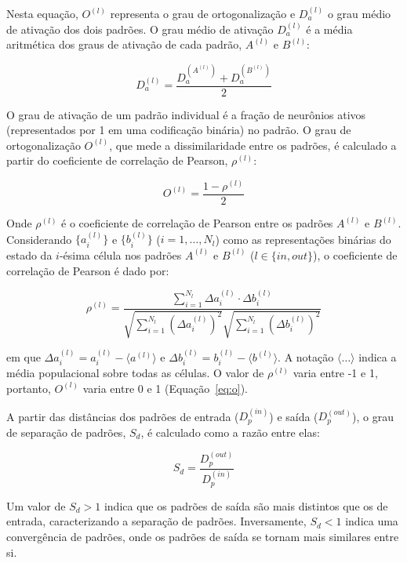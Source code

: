 Nesta equação, $O^{(l)}$ representa o grau de ortogonalização e $D_a^{(l)}$ o grau médio de ativação dos dois padrões. O grau médio de ativação $D_a^{(l)}$ é a média aritmética dos graus de ativação de cada padrão, $A^{(l)}$ e $B^{(l)}$:

\begin{equation}
    \label{eq:da}
    D_a^{(l)} = \frac{D_a^{(A^{(l)})} + D_a^{(B^{(l)})}}{2}
\end{equation}

O grau de ativação de um padrão individual é a fração de neurônios ativos (representados por 1 em uma codificação binária) no padrão.
O grau de ortogonalização $O^{(l)}$, que mede a dissimilaridade entre os padrões, é calculado a partir do coeficiente de correlação de Pearson, $\rho^{(l)}$:

\begin{equation}
    \label{eq:o}
    O^{(l)} = \frac{1 - \rho^{(l)}}{2}
\end{equation}

Onde $\rho^{(l)}$ é o coeficiente de correlação de Pearson entre os padrões $A^{(l)}$ e $B^{(l)}$.
Considerando $\{a_i^{(l)}\}$ e $\{b_i^{(l)}\}$ ($i=1, \dots, N_l$) como as representações binárias do estado da $i$-ésima célula nos padrões $A^{(l)}$ e $B^{(l)}$ ($l \in \{in, out\}$), o coeficiente de correlação de Pearson é dado por:

\begin{equation}
    \label{eq:pearson}
    \rho^{(l)} = \frac{\sum_{i=1}^{N_l} \Delta a_i^{(l)} \cdot \Delta b_i^{(l)}}{\sqrt{\sum_{i=1}^{N_l} (\Delta a_i^{(l)})^2} \sqrt{\sum_{i=1}^{N_l} (\Delta b_i^{(l)})^2}}
\end{equation}

em que $\Delta a_i^{(l)} = a_i^{(l)} - \langle a^{(l)} \rangle$ e $\Delta b_i^{(l)} = b_i^{(l)} - \langle b^{(l)} \rangle$. A
notação $\langle \dots \rangle$ indica a média populacional sobre todas as células. O valor de $\rho^{(l)}$ varia entre -1 e 1,
portanto, $O^{(l)}$ varia entre 0 e 1 (Equação~\ref{eq:o}).

A partir das distâncias dos padrões de entrada ($D_p^{(in)}$) e saída ($D_p^{(out)}$), o grau de separação de padrões, $S_d$, é calculado como a razão entre elas:

\begin{equation}
    \label{eq:sd}
    S_d = \frac{D_p^{(out)}}{D_p^{(in)}}
\end{equation}

Um valor de $S_d > 1$ indica que os padrões de saída são mais distintos que os de entrada, caracterizando a separação de padrões. Inversamente, $S_d < 1$ indica uma convergência de padrões, onde os padrões de saída se tornam mais similares entre si.

